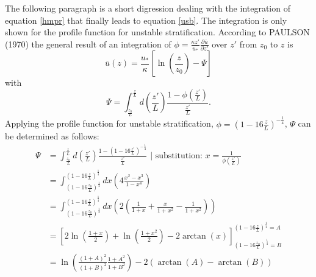 \documentclass[11pt,a4paper,titlepage]{scrreprt}
\begin{document}
The following paragraph is a short digression dealing with the integration of equation \ref{hmpr} that finally leads to equation \ref{usb}. The integration 
is only shown for the profile function for unstable stratification. According to PAULSON (1970) the general result of an integration of $\phi=\frac{\kappa z'}{u_{\ast}} 
\frac{\partial \overline{u}}{\partial z'}$ over $z'$ from $z_0$ to $z$ is
\begin{equation}
\overline{u}(z) = \frac{u_{\ast}}{\kappa} \left [ \ln \left ( \frac{z}{z_0} \right ) - \Psi \right ] 
\end{equation}
with
\begin{equation}
\Psi = \int_{\frac{z_0}{L}}^{\frac{z}{L}}d \left ( \frac{z'}{L} \right ) \frac{1-\phi \left ( \frac{z'}{L} \right )}{\frac{z'}{L}}.
\end{equation}  
Applying the profile function for unstable stratification, $\phi=\left ( 1 - 16 \frac{z}{L} \right )^{-\frac{1}{4}}$, $\Psi$ can be determined as follows:
\begin{equation}
\begin{split}
\Psi &= \int_{\frac{z_0}{L}}^{\frac{z}{L}}d \left ( \frac{z'}{L} \right ) \frac{1- \left ( 1 - 16 \frac{z'}{L} \right )^{-\frac{1}{4}} }{\frac{z'}{L}} \text{ | substitution: } x=\frac{1}{\phi \left ( \frac{z'}{L} \right ) } \\
     &= \int_{\left ( 1-16\frac{z_0}{L} \right )^{\frac{1}{4}}}^{\left ( 1-16\frac{z}{L} \right )^{\frac{1}{4}}} dx \left ( 4 \frac{x^2 - x^3}{1 - x^4} \right ) \\
     &= \int_{\left ( 1-16\frac{z_0}{L} \right )^{\frac{1}{4}}}^{\left ( 1-16\frac{z}{L} \right )^{\frac{1}{4}}} dx \left ( 2 \left ( \frac{1}{1+x} + \frac{x}{1+x^2} - \frac{1}{1+x^2} \right ) \right ) \\
     &= \left [ 2 \ln \left ( \frac{1+x}{2} \right ) + \ln \left ( \frac{1+x^2}{2} \right ) -2 \arctan(x) \right ]_{\left ( 1-16\frac{z_0}{L} \right )^{\frac{1}{4}}=B}^{\left ( 1-16\frac{z}{L} \right )^{\frac{1}{4}}=A} \\
     &= \ln \left ( \frac{\left ( 1 + A \right )^2}{\left ( 1 + B \right )^2} \frac{1+A^2}{1+B^2} \right ) - 2 \left ( \arctan(A) - \arctan(B) \right )
\end{split}
\end{equation} 
\end{document}
